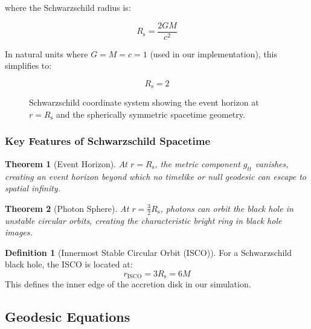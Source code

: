 \documentclass[12pt,a4paper]{article}
\newtheorem{theorem}{Theorem}[section]
\theoremstyle{definition}
\newtheorem{definition}{Definition}[section]
\theoremstyle{remark}
\newcommand{\Rs}{R_{\text{s}}}
\newcommand{\ISCO}{\text{ISCO}}
\begin{document}
where the Schwarzschild radius is:

\begin{equation}
    \Rs = \frac{2GM}{c^2}
\end{equation}

In natural units where $G = M = c = 1$ (used in our implementation), this simplifies to:

\begin{equation}
    \Rs = 2
\end{equation}

\begin{figure}[H]
    \centering
    \caption{Schwarzschild coordinate system showing the event horizon at $r = \Rs$ and the spherically symmetric spacetime geometry.}
    \label{fig:schwarzschild_coords}
\end{figure}

\subsubsection{Key Features of Schwarzschild Spacetime}

\begin{theorem}[Event Horizon]
At $r = \Rs$, the metric component $g_{tt}$ vanishes, creating an event horizon beyond which no timelike or null geodesic can escape to spatial infinity.
\end{theorem}

\begin{theorem}[Photon Sphere]
At $r = \frac{3}{2}\Rs$, photons can orbit the black hole in unstable circular orbits, creating the characteristic bright ring in black hole images.
\end{theorem}

\begin{definition}[Innermost Stable Circular Orbit (ISCO)]
For a Schwarzschild black hole, the ISCO is located at:
\begin{equation}
    r_{\ISCO} = 3\Rs = 6M
\end{equation}
This defines the inner edge of the accretion disk in our simulation.
\end{definition}

\subsection{Geodesic Equations}
\end{document}
